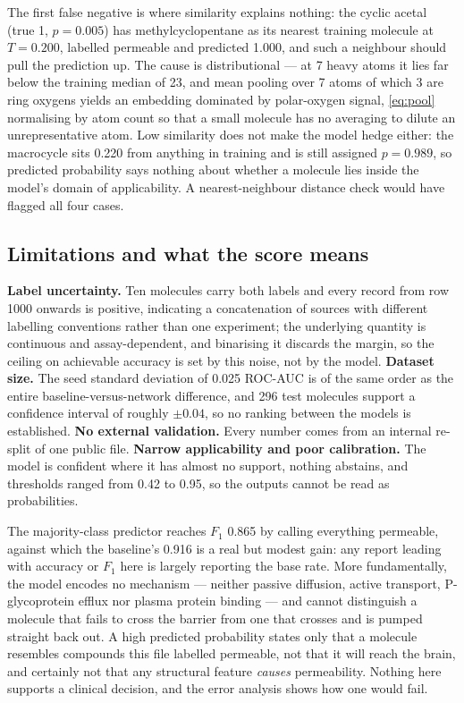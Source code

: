 The first false negative is where similarity explains nothing: the cyclic acetal (true 1, $p = 0.005$) has methylcyclopentane as its nearest training molecule at $T = 0.200$, labelled permeable and predicted 1.000, and such a neighbour should pull the prediction up. The cause is distributional --- at 7 heavy atoms it lies far below the training median of 23, and mean pooling over 7 atoms of which 3 are ring oxygens yields an embedding dominated by polar-oxygen signal, \cref{eq:pool} normalising by atom count so that a small molecule has no averaging to dilute an unrepresentative atom. Low similarity does not make the model hedge either: the macrocycle sits 0.220 from anything in training and is still assigned $p = 0.989$, so predicted probability says nothing about whether a molecule lies inside the model's domain of applicability. A nearest-neighbour distance check would have flagged all four cases.

\subsection{Limitations and what the score means}

\textbf{Label uncertainty.} Ten molecules carry both labels and every record from row 1000 onwards is positive, indicating a concatenation of sources with different labelling conventions rather than one experiment; the underlying quantity is continuous and assay-dependent, and binarising it discards the margin, so the ceiling on achievable accuracy is set by this noise, not by the model. \textbf{Dataset size.} The seed standard deviation of 0.025 ROC-AUC is of the same order as the entire baseline-versus-network difference, and 296 test molecules support a confidence interval of roughly $\pm 0.04$, so no ranking between the models is established. \textbf{No external validation.} Every number comes from an internal re-split of one public file. \textbf{Narrow applicability and poor calibration.} The model is confident where it has almost no support, nothing abstains, and thresholds ranged from 0.42 to 0.95, so the outputs cannot be read as probabilities.

The majority-class predictor reaches $F_1$ 0.865 by calling everything permeable, against which the baseline's 0.916 is a real but modest gain: any report leading with accuracy or $F_1$ here is largely reporting the base rate. More fundamentally, the model encodes no mechanism --- neither passive diffusion, active transport, P-glycoprotein efflux nor plasma protein binding --- and cannot distinguish a molecule that fails to cross the barrier from one that crosses and is pumped straight back out. A high predicted probability states only that a molecule resembles compounds this file labelled permeable, not that it will reach the brain, and certainly not that any structural feature \emph{causes} permeability. Nothing here supports a clinical decision, and the error analysis shows how one would fail.
